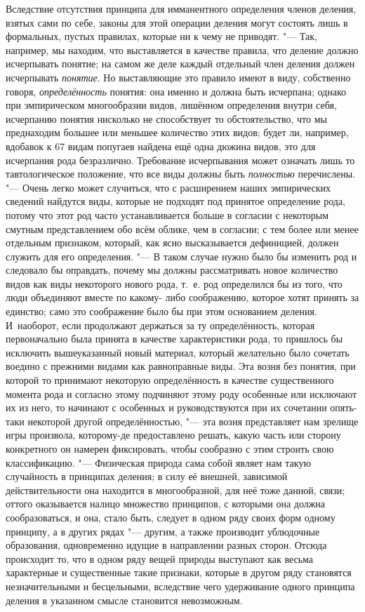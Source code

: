 Вследствие отсутствия принципа для имманентного определения
членов деления, взятых сами по себе, законы для этой операции деления могут
состоять лишь в формальных, пустых правилах, которые ни к чему не
приводят. "--- Так, например, мы находим, что выставляется в
качестве правила, что деление должно исчерпывать понятие; на самом же деле
каждый отдельный член деления должен исчерпывать {\em понятие}. Но
выставляющие это правило имеют в виду, собственно говоря, {\em определённость}
понятия: она именно и должна быть исчерпана; однако при
эмпирическом многообразии видов, лишённом определения внутри
себя, исчерпанию понятия нисколько не способствует то обстоятельство, что
мы преднаходим большее или меньшее количество этих видов; будет ли,
например, вдобавок к 67 видам попугаев найдена ещё одна дюжина видов, это
для исчерпания рода безразлично. Требование исчерпывания может означать
лишь то тавтологическое положение, что все виды должны быть {\em полностью}
перечислены. "--- Очень легко может случиться,
что с расширением наших эмпирических сведений найдутся виды, которые не
подходят под принятое определение рода, потому что этот род часто
устанавливается больше в согласии с некоторым смутным представлением обо
всём облике, чем в согласии; с тем более или менее отдельным признаком,
который, как ясно высказывается дефиницией, должен служить для его
определения. "--- В таком случае нужно было бы изменить род и
следовало бы оправдать, почему мы должны рассматривать новое количество
видов как виды некоторого нового рода, т.~е. род определился бы из того,
что люди объединяют вместе по какому- либо соображению, которое хотят
принять за единство; само это соображение было бы при этом основанием
деления. И~наоборот, если продолжают держаться за ту определённость,
которая первоначально была принята в качестве характеристики рода, то
пришлось бы исключить вышеуказанный новый материал, который желательно было
сочетать воедино с прежними видами как равноправные виды. Эта возня без
понятия, при которой то принимают некоторую определённость в качестве
существенного момента рода и согласно этому подчиняют этому роду особенные
или исключают их из него, то начинают с особенных и руководствуются при их
сочетании опять-таки некоторой другой определённостью, "--- эта
возня представляет нам зрелище игры произвола, которому-де предоставлено
решать, какую часть или сторону конкретного он намерен фиксировать, чтобы
сообразно с этим строить свою классификацию. "--- Физическая
природа сама собой являет нам такую случайность в принципах деления; в силу
её внешней, зависимой действительности она находится в многообразной, для
неё тоже данной, связи; оттого оказывается налицо множество принципов, с
которыми она должна сообразоваться, и она, стало быть, следует в одном ряду
своих форм одному принципу, а в других рядах "--- другим, а
также производит ублюдочные образования, одновременно идущие в направлении
разных сторон. Отсюда происходит то, что в одном ряду вещей природы
выступают как весьма характерные и существенные такие признаки, которые в
другом ряду становятся незначительными и бесцельными, вследствие
чего удерживание одного принципа деления в указанном смысле
становится невозможным.

